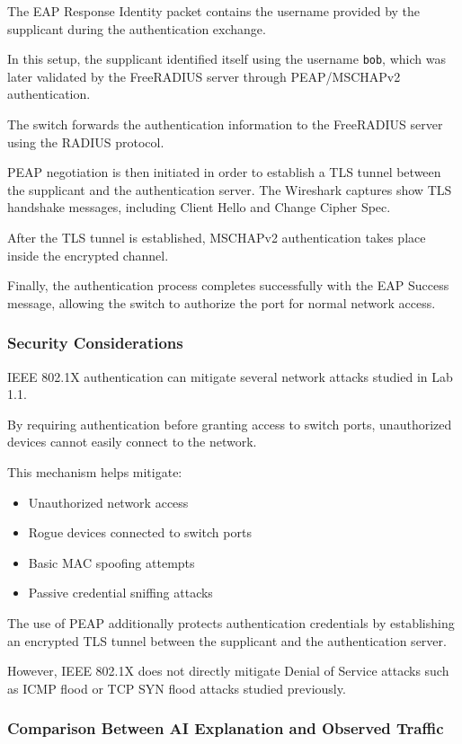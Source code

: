 \documentclass[12pt]{article}
\begin{document}
The EAP Response Identity packet contains the
username provided by the supplicant during
the authentication exchange.

In this setup, the supplicant identified itself
using the username \texttt{bob}, which was later
validated by the FreeRADIUS server through
PEAP/MSCHAPv2 authentication.

The switch forwards the authentication information
to the FreeRADIUS server using the RADIUS protocol.

PEAP negotiation is then initiated in order to
establish a TLS tunnel between the supplicant
and the authentication server.
The Wireshark captures show TLS handshake
messages, including Client Hello and Change Cipher Spec.

After the TLS tunnel is established,
MSCHAPv2 authentication takes place inside
the encrypted channel.

Finally, the authentication process completes
successfully with the EAP Success message,
allowing the switch to authorize the port
for normal network access.

\subsubsection{Security Considerations}

IEEE 802.1X authentication can mitigate several
network attacks studied in Lab 1.1.

By requiring authentication before granting
access to switch ports, unauthorized devices
cannot easily connect to the network.

This mechanism helps mitigate:

\begin{itemize}
\item Unauthorized network access
\item Rogue devices connected to switch ports
\item Basic MAC spoofing attempts
\item Passive credential sniffing attacks
\end{itemize}

The use of PEAP additionally protects
authentication credentials by establishing
an encrypted TLS tunnel between the supplicant
and the authentication server.

However, IEEE 802.1X does not directly mitigate
Denial of Service attacks such as ICMP flood
or TCP SYN flood attacks studied previously.

\subsubsection{Comparison Between AI Explanation and Observed Traffic}
\end{document}
